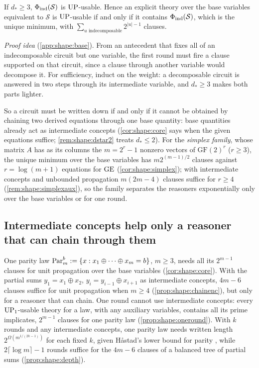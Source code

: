 \begin{theorem}\label{thm:shape:minimum}
If $d_*\ge3$, $\Phi_{\rm ind}(\mathcal S)$ is $\mathrm{UP}$-usable. Hence an explicit theory over the base variables equivalent to $\mathcal S$ is $\mathrm{UP}$-usable if and only if it contains $\Phi_{\rm ind}(\mathcal S)$, which is the unique minimum, with $\sum_{u\text{ indecomposable}}2^{\lvert u\rvert-1}$ clauses.
\end{theorem}

\emph{Proof idea} (\cref{app:shape:base}). From an antecedent that fixes all of an indecomposable circuit but one variable, the first round must fire a clause supported on that circuit, since a clause through another variable would decompose it. For sufficiency, induct on the weight: a decomposable circuit is answered in two steps through its intermediate variable, and $d_*\ge3$ makes both parts lighter.

So a circuit must be written down if and only if it cannot be obtained by chaining two derived equations through one base quantity: base quantities already act as intermediate concepts (\cref{cor:shape:core} says when the given equations suffice; \cref{rem:shape:dstar2} treats $d_*\le2$). For the \emph{simplex family}, whose matrix $A$ has as its columns the $m=2^r-1$ nonzero vectors of $\mathrm{GF}(2)^r$ ($r\ge3$), the unique minimum over the base variables has $m2^{(m-1)/2}$ clauses against $r=\log(m+1)$ equations for $\mathrm{GE}$ (\cref{cor:shape:simplex}); with intermediate concepts and unbounded propagation $m(2m-4)$ clauses suffice for $r\ge4$ (\cref{rem:shape:simplexaux}), so the family separates the reasoners exponentially only over the base variables or for one round.

\subsection{Intermediate concepts help only a reasoner that can chain through them}\label{sec:shape:aux}

One parity law $\mathrm{Par}^b_m:=\{x:x_1\oplus\dots\oplus x_m=b\}$, $m\ge3$, needs all its $2^{m-1}$ clauses for unit propagation over the base variables (\cref{cor:shape:core}). With the partial sums $y_1=x_1\oplus x_2$, $y_i=y_{i-1}\oplus x_{i+1}$ as intermediate concepts, $4m-6$ clauses suffice for unit propagation when $m\ge4$ (\cref{prop:shape:chainenc}), but only for a reasoner that can chain. One round cannot use intermediate concepts: every $\mathrm{UP}_1$-usable theory for a law, with any auxiliary variables, contains all its prime implicates, $2^{m-1}$ clauses for one parity law (\cref{prop:shape:oneround}). With $k$ rounds and any intermediate concepts, one parity law needs written length $2^{\Omega(m^{1/(2k-1)})}$ for each fixed $k$, given H{\aa}stad's lower bound for parity \citep{hastad1986almost}, while $2\lceil\log m\rceil-1$ rounds suffice for the $4m-6$ clauses of a balanced tree of partial sums (\cref{prop:shape:depth}).

